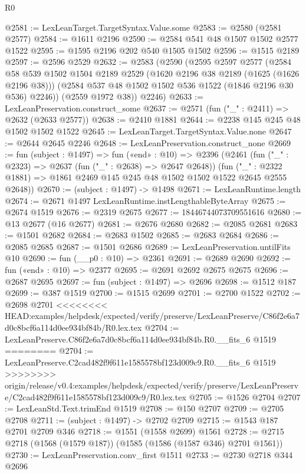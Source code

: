 \begin{lexlean}{R0}
\begin{coremodule}
{{{{{{{{{{{{{{{{{{{{{{{{{{{{{{{{{{{{{{{{{{{{{{{{{{{{{{{{{{{{{{{{{{{{{{{{{@2581 := LexLeanTarget.TargetSyntax.Value.some
@2583 := @2580 (@2581 @2577)
@2584 := @1611 @2196
@2590 := @2584 @541 @48 @1507 @1502 @2577 @1522
@2595 := @1595 @2196 @202 @540 @1505 @1502
@2596 := @1515 @2189
@2597 := @2596 @2529
@2632 := @2583
    (@2590
      (@2595
        @2597
        @2577
        (@2584
          @58
          @539
          @1502
          @1504
          @2189
          @2529
          (@1620 @2196 @38 @2189 (@1625 (@1626 @2196 @38)))
          (@2584 @537 @48 @1502 @1502 @536 @1522 (@1846 @2196 @30 @536) @2246))
        (@2559 @1972 @38))
      @2246)
@2633 := LexLeanPreservation.construct_some
@2637 := @2571 (fun ("_" : @2411) => @2632 (@2633 @2577))
@2638 := @2410 @1881
@2644 := @2238 @145 @245 @48 @1502 @1502 @1522
@2645 := LexLeanTarget.TargetSyntax.Value.none
@2647 := @2644 @2645 @2246
@2648 := LexLeanPreservation.construct_none
@2669 := fun (subject : @1497) =>
  fun («end» : @10) =>
  @2396
    (@2461
      (fun ("_" : @2323) => @2637 (fun ("_" : @2638) => @2647 @2648))
      (fun ("_" : @2322 @1881) => @1861 @2469 @145 @245 @48 @1502 @1502 @1522 @2645 @2555 @2648))
@2670 := (subject : @1497) -> @1498
@2671 := LexLeanRuntime.length
@2674 := @2671 @1497 LexLeanRuntime.instLengthableByteArray
@2675 := @2674 @1519
@2676 := @2319 @2675
@2677 := 18446744073709551616
@2680 := @13 @2677 (@16 @2677)
@2681 := @2676 @2680
@2682 := @2085 @2681
@2683 := @1501 @2682
@2684 := @2683 @1502
@2685 := @2683 @2684
@2686 := @2085 @2685
@2687 := @1501 @2686
@2689 := LexLeanPreservation.untilFits @10
@2690 := fun (__p0 : @10) => @2361
@2691 := @2689 @2690
@2692 := fun («end» : @10) => @2377
@2695 := @2691 @2692 @2675 @2675
@2696 := @2687 @2695
@2697 := fun (subject : @1497) => @2696
@2698 := @1512 @187
@2699 := @387 @1519
@2700 := @1515 @2699
@2701 := @2700 @1522
@2702 := @2698 @2701
<<<<<<<< HEAD:examples/helpdesk/expected/verify/preserve/LexLeanPreserve/C86f2e6a7d0c8bcf6a114d0ee934bf84b/R0.lex.tex
@2704 := LexLeanPreserve.C86f2e6a7d0c8bcf6a114d0ee934bf84b.R0.__fits_6 @1519
========
@2704 := LexLeanPreserve.C2cad482f9f611e1585578bf123d009c9.R0.__fits_6 @1519
>>>>>>>> origin/release/v0.4:examples/helpdesk/expected/verify/preserve/LexLeanPreserve/C2cad482f9f611e1585578bf123d009c9/R0.lex.tex
@2705 := @1526 @2704
@2707 := LexLeanStd.Text.trimEnd @1519
@2708 := @150 @2707
@2709 := @2705 @2708
@2711 := (subject : @1497) -> @2702 @2709
@2715 := @1543 @187 @2701 @2709 @346
@2718 := @1551 (@1558 @2699) @1561
@2728 := @2715 @2718 (@1568 (@1579 @187)) (@1585 (@1586 (@1587 @346) @2701 @1561))
@2730 := LexLeanPreservation.conv_first @1511
@2733 := @2730 @2718 @344 @2696
}}}}}}}}}}}}}}}}}}}}}}}}}}}}}}}}}}}}}}}}}}}}}}}}}}}}}}}}}}}}}}}}}}}}}}}}}
\end{coremodule}
\end{lexlean}
